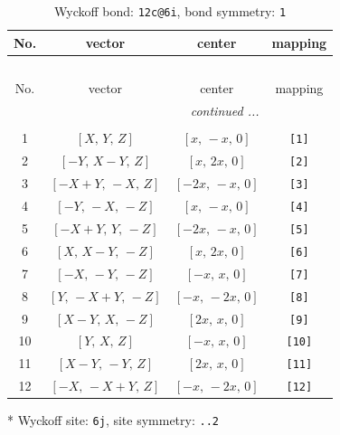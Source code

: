 \documentclass[fleqn,8pt]{jsarticle}
\begin{document}
\begin{longtable}{cccc}
\caption{Wyckoff bond: {\tt 12c@6i}, bond symmetry: {\tt 1}}
 \\
 \hline \hline
No. & vector & center & mapping \\ \hline \endfirsthead

\multicolumn{3}{l}{\tablename\ \thetable{}} \\
 \hline \hline
No. & vector & center & mapping \\ \hline \endhead

 \hline \hline
\multicolumn{3}{r}{\footnotesize\it continued ...} \\ \endfoot

 \hline \hline
\multicolumn{3}{r}{} \\ \endlastfoot

1 & $\left[ X,\, Y,\, Z \right]$ & $\left[ x,\, - x,\, 0 \right]$ & {\tt [1]} \\ \hline
2 & $\left[ - Y,\, X - Y,\, Z \right]$ & $\left[ x,\, 2 x,\, 0 \right]$ & {\tt [2]} \\ \hline
3 & $\left[ - X + Y,\, - X,\, Z \right]$ & $\left[ - 2 x,\, - x,\, 0 \right]$ & {\tt [3]} \\ \hline
4 & $\left[ - Y,\, - X,\, - Z \right]$ & $\left[ x,\, - x,\, 0 \right]$ & {\tt [4]} \\ \hline
5 & $\left[ - X + Y,\, Y,\, - Z \right]$ & $\left[ - 2 x,\, - x,\, 0 \right]$ & {\tt [5]} \\ \hline
6 & $\left[ X,\, X - Y,\, - Z \right]$ & $\left[ x,\, 2 x,\, 0 \right]$ & {\tt [6]} \\ \hline
7 & $\left[ - X,\, - Y,\, - Z \right]$ & $\left[ - x,\, x,\, 0 \right]$ & {\tt [7]} \\ \hline
8 & $\left[ Y,\, - X + Y,\, - Z \right]$ & $\left[ - x,\, - 2 x,\, 0 \right]$ & {\tt [8]} \\ \hline
9 & $\left[ X - Y,\, X,\, - Z \right]$ & $\left[ 2 x,\, x,\, 0 \right]$ & {\tt [9]} \\ \hline
10 & $\left[ Y,\, X,\, Z \right]$ & $\left[ - x,\, x,\, 0 \right]$ & {\tt [10]} \\ \hline
11 & $\left[ X - Y,\, - Y,\, Z \right]$ & $\left[ 2 x,\, x,\, 0 \right]$ & {\tt [11]} \\ \hline
12 & $\left[ - X,\, - X + Y,\, Z \right]$ & $\left[ - x,\, - 2 x,\, 0 \right]$ & {\tt [12]} \\
\end{longtable}
* Wyckoff site: {\tt 6j}, site symmetry: {\tt ..2}
\renewcommand{\arraystretch}{1.2}
\end{document}
